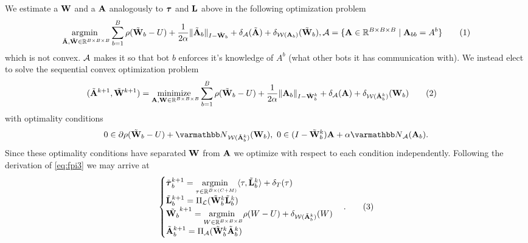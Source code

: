 \documentclass{article}
\newcommand\numberthis{\addtocounter{equation}{1}\tag{\theequation}}
\begin{document}
We estimate a ${\mathbf{W}}$ and a ${\mathbf{A}}$ analogously to $\boldsymbol{\tau}$ and ${\mathbf{L}}$ above in the following optimization problem
\begin{align*}
    \underset{\tilde{\vA},\tilde{\vW} \in \RR^{B \times B \times B}}{\text{argmin }} 
    \sum^B_{b=1} \rho(\tilde{\vW}_b-U) + \frac{1}{2\alpha}\|\tilde{\vA}_b\|_{I-\tilde{\vW}_b} + \delta_{\cA}(\tilde{\vA}) +
    \delta_{\cW(\vA_b)}(\tilde{\vW}_b), 
    \cA = \{ \vA \in \RR^{B \times B \times B}\mid \vA_{bb} = A^{b} \}
    \numberthis \label{eq:objective_function_mix}
\end{align*}
which is not convex. ${\mathcal{A}}$ makes it so that bot $b$ enforces it's knowledge of $A^b$ (what other bots it has communication with). We instead elect to solve the sequential convex optimization problem
\begin{align*}
    (\tilde{\vA}^{k+1}, \tilde{\vW}^{k+1}) = 
    \underset{\vA, \vW \in \RR^{B \times B \times B}}{\text{minimize }} & 
    \sum^B_{b=1} \rho(\tilde{\vW}_b-U) + \frac{1}{2\alpha}\|\vA_b\|_{I-\tilde{\vW}^k_b} + \delta_{\cA}(\vA) +
    \delta_{\cW(\tilde{\vA}^k_b)}(\vW_b)
    \numberthis \label{eq:objective_function_mix_scp}
\end{align*}
with optimality conditions
\begin{align*}
    0 \in \partial \rho(\tilde{\vW}_b-U)
     + \opN_{\cW(\tilde{\vA}^k_b)}(\vW_b)
    ,\ 
    0 \in (I-\tilde{\vW}_b^k)\vA + \alpha \opN_{\cA}(\vA_b).
\end{align*}
 Since these optimality conditions have separated ${\mathbf{W}}$ from ${\mathbf{A}}$ we optimize with respect to each condition independently. Following the derivation of \eqref{eq:fpi3} we may arrive at
\begin{align*}
    \begin{cases}
    \tilde{\vtau}_b^{k+1} = \underset{\tau \in \RR^{B\times(C+M)} }{\text{argmin }} \langle \tau, \tilde{\vL}_b^k \rangle + \delta_T(\tau) \\
    \tilde{\vL}_b^{k+1} = \Pi_{\cL}(\tilde{\vW}_b^{k}\tilde{\vL}_b^{k})\\
    \tilde{\vW_b}^{k+1} = \underset{W \in \RR^{B\times B\times B} }{\text{argmin }} \rho(W-U) + \delta_{\cW(\tilde{\vA}^k_b)}(W) \\
    \tilde{\vA}_b^{k+1} = \Pi_{\cA}(\tilde{\vW}_b^{k}\tilde{\vA}_b^{k})
    \end{cases}.
    \numberthis \label{eq:fpi4}
\end{align*}
\end{document}
